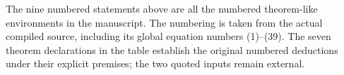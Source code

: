 \normalsize
The nine numbered statements above are all the numbered theorem-like environments in the manuscript. The numbering is taken from the actual compiled source, including its global equation numbers (1)--(39). The seven theorem declarations in the table establish the original numbered deductions under their explicit premises; the two quoted inputs remain external.

\fi
